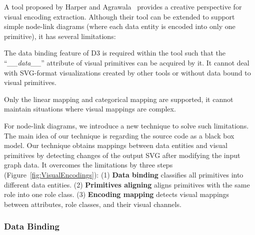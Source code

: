A tool proposed by Harper and Agrawala~\cite{DBLP:conf/uist/HarperA14} provides a creative perspective for visual encoding extraction.
Although their tool can be extended to support simple node-link diagrams (where each data entity is encoded into only one primitive), it has several limitations:
\begin{compactenum}

\item The data binding feature of D3 is required within the tool such that the ``\textit{\_\_data\_\_}'' attribute of visual primitives can be acquired by it. 
It cannot deal with SVG-format visualizations created by other tools or without data bound to visual primitives.

\item Only the linear mapping and categorical mapping are supported, it cannot maintain situations where visual mappings are complex.

\end{compactenum}

For node-link diagrams, we introduce a new technique to solve such limitations.
The main idea of our technique is regarding the source code as a black box model.
Our technique obtains mappings between data entities and visual primitives by detecting changes of the output SVG after modifying the input graph data.
It overcomes the limitations by three steps (Figure~\ref{fig:VisualEncodings}):
(1) \textbf{Data binding} classifies all primitives into different data entities.
(2) \textbf{Primitives aligning} aligns primitives with the same role into one role class. 
(3) \textbf{Encoding mapping} detects visual mappings between attributes, role classes, and their visual channels.

\subsubsection{Data Binding}

